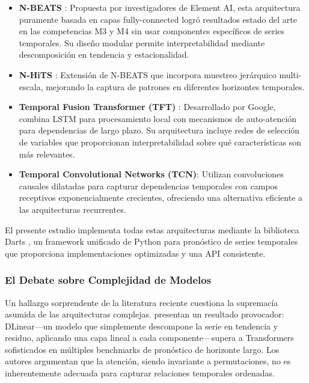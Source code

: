 \documentclass[11pt,a4paper]{article}
\begin{document}
\begin{itemize}[noitemsep]
    \item \textbf{N-BEATS} \citep{oreshkin2019nbeats}: Propuesta por investigadores de Element AI, esta arquitectura puramente basada en capas fully-connected logró resultados estado del arte en las competencias M3 y M4 sin usar componentes específicos de series temporales. Su diseño modular permite interpretabilidad mediante descomposición en tendencia y estacionalidad.

    \item \textbf{N-HiTS} \citep{challu2022nhits}: Extensión de N-BEATS que incorpora muestreo jerárquico multi-escala, mejorando la captura de patrones en diferentes horizontes temporales.

    \item \textbf{Temporal Fusion Transformer (TFT)} \citep{lim2021tft}: Desarrollado por Google, combina LSTM para procesamiento local con mecanismos de auto-atención para dependencias de largo plazo. Su arquitectura incluye redes de selección de variables que proporcionan interpretabilidad sobre qué características son más relevantes.

    \item \textbf{Temporal Convolutional Networks (TCN)}: Utilizan convoluciones causales dilatadas para capturar dependencias temporales con campos receptivos exponencialmente crecientes, ofreciendo una alternativa eficiente a las arquitecturas recurrentes.
\end{itemize}

El presente estudio implementa todas estas arquitecturas mediante la biblioteca Darts \citep{herzen2022darts}, un framework unificado de Python para pronóstico de series temporales que proporciona implementaciones optimizadas y una API consistente.

\subsubsection{El Debate sobre Complejidad de Modelos}

Un hallazgo sorprendente de la literatura reciente cuestiona la supremacía asumida de las arquitecturas complejas. \citet{zeng2023} presentan un resultado provocador: DLinear---un modelo que simplemente descompone la serie en tendencia y residuo, aplicando una capa lineal a cada componente---supera a Transformers sofisticados en múltiples benchmarks de pronóstico de horizonte largo. Los autores argumentan que la atención, siendo invariante a permutaciones, no es inherentemente adecuada para capturar relaciones temporales ordenadas.
\end{document}
